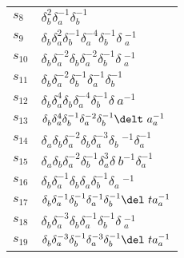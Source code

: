\documentclass{article}
\begin{document}
\begin{center}
\begin{tabular}{ll}
$s_{8}$ & $\delta_b^{2}\delta_a^{-1}\delta_b^{-1}$ \\
$s_{9}$ & $\delta_b^{}\delta_a^{2}\delta_b^{-1}\delta_a^{-4}\delta_b^{-1}\delta\
_a^{-1}$ \\
$s_{10}$ & $\delta_b^{}\delta_a^{-2}\delta_b^{}\delta_a^{-2}\delta_b^{-1}\delta\
_a^{-1}$ \\
$s_{11}$ & $\delta_b^{}\delta_a^{-2}\delta_b^{-1}\delta_a^{-1}\delta_b^{-1}$ \\
$s_{12}$ & $\delta_b^{}\delta_a^{4}\delta_b^{}\delta_a^{-4}\delta_b^{-1}\delta_\
a^{-1}$ \\
$s_{13}$ & $\delta_b^{}\delta_a^{4}\delta_b^{-1}\delta_a^{-2}\delta_b^{-1}\delt\
a_a^{-1}$ \\
$s_{14}$ & $\delta_a^{}\delta_b^{}\delta_a^{-2}\delta_b^{}\delta_a^{-3}\delta_b\
^{-1}\delta_a^{-1}$ \\
$s_{15}$ & $\delta_a^{}\delta_b^{}\delta_a^{-2}\delta_b^{-1}\delta_a^{3}\delta_\
b^{-1}\delta_a^{-1}$ \\
$s_{16}$ & $\delta_b^{}\delta_a^{-1}\delta_b^{}\delta_a^{}\delta_b^{-1}\delta_a\
^{-1}$ \\
$s_{17}$ & $\delta_b^{}\delta_a^{-1}\delta_b^{-1}\delta_a^{-1}\delta_b^{-1}\del\
ta_a^{-1}$ \\
$s_{18}$ & $\delta_b^{}\delta_a^{-3}\delta_b^{}\delta_a^{-1}\delta_b^{-1}\delta\
_a^{-1}$ \\
$s_{19}$ & $\delta_b^{}\delta_a^{-3}\delta_b^{-1}\delta_a^{-3}\delta_b^{-1}\del\
ta_a^{-1}$ \\
\bottomrule
\end{tabular}
\end{center}

\thispagestyle{empty}
\end{document}
